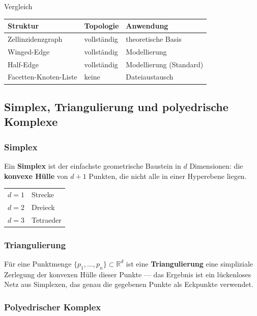 \documentclass[12pt, a4paper]{article}
\begin{document}
\begin{notebox}{Vergleich}
\begin{tabular}{lll}
  \textbf{Struktur} & \textbf{Topologie} & \textbf{Anwendung} \\
  \hline
  Zellinzidenzgraph & vollständig & theoretische Basis \\
  Winged-Edge & vollständig & Modellierung \\
  Half-Edge & vollständig & Modellierung (Standard) \\
  Facetten-Knoten-Liste & keine & Dateiaustausch \\
\end{tabular}
\end{notebox}

\subsection{Simplex, Triangulierung und polyedrische Komplexe}

\subsubsection*{Simplex}

Ein \textbf{Simplex} ist der einfachste geometrische Baustein in $d$ Dimensionen: die \textbf{konvexe Hülle} von $d+1$ Punkten, die nicht alle in einer Hyperebene liegen.

\begin{center}
\begin{tabular}{ll}
  $d=1$ & Strecke \\
  $d=2$ & Dreieck \\
  $d=3$ & Tetraeder \\
\end{tabular}
\end{center}

\subsubsection*{Triangulierung}

Für eine Punktmenge $\{p_1, \dots, p_n\} \subset \mathbb{R}^d$ ist eine \textbf{Triangulierung} eine simpliziale Zerlegung der konvexen Hülle dieser Punkte — das Ergebnis ist ein lückenloses Netz aus Simplexen, das genau die gegebenen Punkte als Eckpunkte verwendet.

\subsubsection*{Polyedrischer Komplex}
\end{document}
